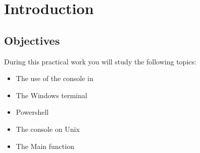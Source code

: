 \section{Introduction}

\subsection{Objectives}
During this practical work you will study the following topics:\\

\begin{itemize}
  \item The use of the console in \csharp
  \item The Windows terminal
  \item Powershell
  \item The console on Unix
  \item The Main function
\end{itemize}
